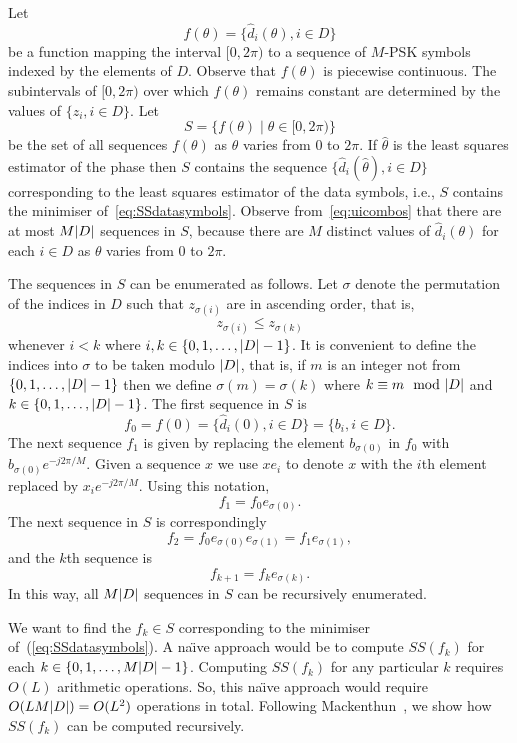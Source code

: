 \documentclass[journal]{IEEEtran}
\begin{document}
Let 
\[
f(\theta) = \{ \hat{d}_i(\theta), i \in D \}
\]
be a function mapping the interval $[0, 2\pi)$ to a sequence of $M$-PSK symbols indexed by the elements of $D$.  Observe that $f(\theta)$ is piecewise continuous.  The subintervals of $[0, 2\pi)$ over which $f(\theta)$ remains constant are determined by the values of $\{z_i, i \in D\}$.  Let
\[
S = \{ f(\theta) \mid \theta \in [0, 2 \pi) \}
\]
be the set of all sequences $f(\theta)$ as $\theta$ varies from $0$ to $2\pi$.  If $\hat{\theta}$ is the least squares estimator of the phase then $S$ contains the sequence $\{ \hat{d}_i(\hat{\theta}), i \in D \}$ corresponding to the least squares estimator of the data symbols, i.e., $S$ contains the minimiser of~\eqref{eq:SSdatasymbols}.  Observe from~\eqref{eq:uicombos} that there are at most $M{\left\vert D \right\vert}$ sequences in $S$, because there are $M$ distinct values of $\hat{d}_i(\theta)$ for each $i \in D$ as $\theta$ varies from $0$ to $2\pi$.

The sequences in $S$ can be enumerated as follows.  Let $\sigma$ denote the permutation of the indices in $D$ such that $z_{\sigma(i)}$ are in ascending order, that is,
\begin{equation}\label{eq:sigmasortind}
z_{\sigma(i)} \leq z_{\sigma(k)}
\end{equation}
whenever $i < k $ where $i, k \in \{0, 1, \dots, {\left\vert D \right\vert}-1\}$.  It is convenient to define the indices into $\sigma$ to be taken modulo ${\left\vert D \right\vert}$, that is, if $m$ is an integer not from $\{0, 1, \dots, {\left\vert D \right\vert}-1\}$ then we define $\sigma(m) = \sigma(k)$ where $k \equiv m \mod \abs{D}$ and $k \in  \{0, 1, \dots, {\left\vert D \right\vert}-1\}$.  The first sequence in $S$ is 
\[
f_0 = f(0) = \{ \hat{d}_i(0), i \in D \} = \{ b_i, i \in D \}.
\]  
The next sequence $f_1$ is given by replacing the element $b_{\sigma(0)}$ in $f_0$ with $b_{\sigma(0)}e^{-j2\pi/M}$.  Given a sequence $x$ we use $x e_i$ to denote $x$ with the $i$th element replaced by $x_i e^{-j2\pi/M}$.  Using this notation,  
\[
f_1 = f_0 e_{\sigma(0)}.
\] 
The next sequence in $S$ is correspondingly 
\[
f_2 = f_0 e_{\sigma(0)} e_{\sigma(1)} = f_1 e_{\sigma(1)},
\]
and the $k$th sequence is
\begin{equation}\label{eq:fkrec}
f_{k+1} = f_{k} e_{\sigma(k)}.
\end{equation}
In this way, all $M{\left\vert D \right\vert}$ sequences in $S$ can be recursively enumerated.

We want to find the $f_k \in S$ corresponding to the minimiser of~(\ref{eq:SSdatasymbols}).  A na\"{\i}ve approach would be to compute $SS(f_k)$ for each $k \in \{0,1,\dots,M{\left\vert D \right\vert}-1\}$.  Computing $SS(f_k)$ for any particular $k$ requires $O(L)$ arithmetic operations.  So, this na\"{\i}ve approach would require $O(L M {\left\vert D \right\vert}) = O(L^2)$ operations in total.  Following Mackenthun~\cite{Mackenthun1994}, we show how $SS(f_k)$ can be computed recursively.
\end{document}
